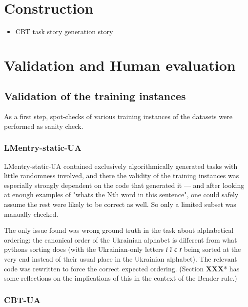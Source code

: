 \section{Construction}\label{construction}

\begin{itemize}
\tightlist
\item
  CBT task story generation story
\end{itemize}

\section{Validation and Human
evaluation}\label{validation-and-human-evaluation}

\subsection{Validation of the training
instances}\label{validation-of-the-training-instances}

As a first step, spot-checks of various training instances of the
datasets were performed as sanity check.

\subsubsection{LMentry-static-UA}\label{lmentry-static-ua}

LMentry-static-UA contained exclusively algorithmically generated tasks
with little randomness involved, and there the validity of the training
instances was especially strongly dependent on the code that generated
it --- and after looking at enough examples of "what\textquotesingle s
the Nth word in this sentence", one could safely assume the rest were
likely to be correct as well. So only a limited subset was manually
checked.

The only issue found was wrong ground truth in the task about
alphabetical ordering: the canonical order of the Ukrainian alphabet is
different from what python\textquotesingle s sorting does (with the
Ukrainian-only letters \emph{і} \emph{ї} \emph{є} \emph{ґ} being sorted
at the very end instead of their usual place in the Ukrainian alphabet).
The relevant code was rewritten to force the correct expected ordering.
(Section \textbf{XXX}* has some reflections on the implications of this
in the context of the Bender rule.)

\subsubsection{CBT-UA}\label{cbt-ua}

